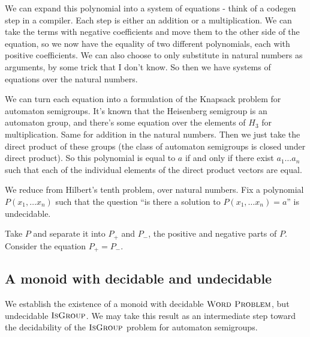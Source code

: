 \documentclass[11pt]{article}
\begin{document}
{\color{TODO}
We can expand this polynomial into a system of equations - think of a
codegen step in a compiler. Each step is either an addition or a
multiplication. We can take the terms with negative coefficients and
move them to the other side of the equation, so we now have the
equality of two different polynomials, each with positive
coefficients. We can also choose to only substitute in natural numbers
as arguments, by some trick that I don't know. So then we have systems
of equations over the natural numbers.

We can turn each equation into a formulation of the Knapsack problem
for automaton semigroups. It's known that the Heisenberg semigroup is
an automaton group, and there's some equation over the elements of
$H_3$ for multiplication. Same for addition in the natural
numbers. Then we just take the direct product of these groups (the
class of automaton semigroups is closed under direct product). So this
polynomial is equal to $a$ if and only if there exist $a_1 \ldots a_n$
such that each of the individual elements of the direct product
vectors are equal.

We reduce from Hilbert's tenth problem, over natural numbers. Fix a
polynomial $P(x_1, \ldots x_n)$ such that the question ``is there a
solution to $P(x_1, \ldots x_n) = a$'' is undecidable.



Take $P$ and separate it into $P_+$ and $P_-$, the positive and
negative parts of $P$. Consider the equation $P_+ = P_-$.
} %

\subsection{A monoid with decidable  and undecidable } 

We establish the existence of a monoid with decidable
$\textsc{Word Problem}$, but undecidable $\textsc{IsGroup}$. We may
take this result as an intermediate step toward the decidability of
the $\textsc{IsGroup}$ problem for automaton semigroups.
\end{document}
